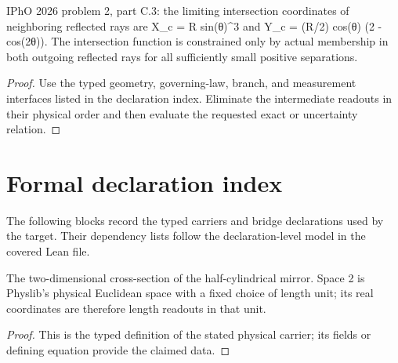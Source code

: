 \begin{theorem}
  \label{thm:physics:IPhO_2026_2_C_3:target}
  IPhO 2026 problem 2, part C.3: the limiting intersection coordinates of neighboring reflected rays are X\_c = R sin(θ)\textasciicircum{}3 and Y\_c = (R/2) cos(θ) (2 - cos(2θ)). The intersection function is constrained only by actual membership in both outgoing reflected rays for all sufficiently small positive separations.
\end{theorem}
\begin{proof}
  Use the typed geometry, governing-law, branch, and measurement interfaces listed in the declaration index.  Eliminate the intermediate readouts in their physical order and then evaluate the requested exact or uncertainty relation.
\end{proof}
\section*{Formal declaration index}
The following blocks record the typed carriers and bridge declarations used by the target.  Their dependency lists follow the declaration-level model in the covered Lean file.

\begin{definition}
  \label{def:physics:IPhO_2026_2_C_3:aux001}
  The two-dimensional cross-section of the half-cylindrical mirror. Space 2 is Physlib's physical Euclidean space with a fixed choice of length unit; its real coordinates are therefore length readouts in that unit.
\end{definition}
\begin{proof}
  This is the typed definition of the stated physical carrier; its fields or defining equation provide the claimed data.
\end{proof}

